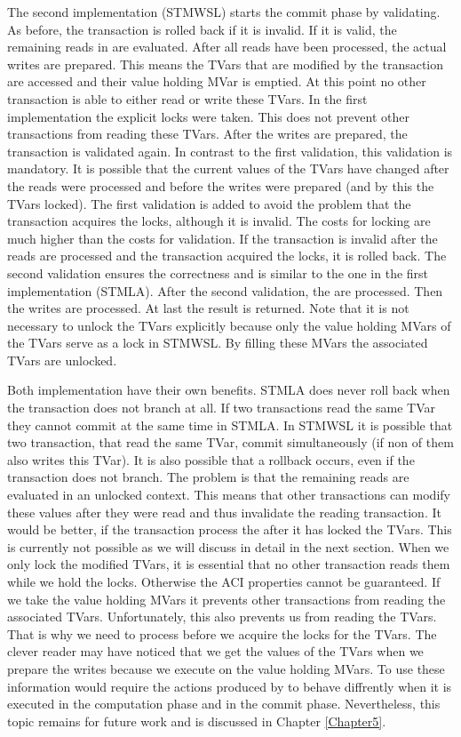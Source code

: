 The second implementation (STMWSL) starts the commit phase by validating. As before, the 
transaction is rolled back if it is invalid. If it is valid, the remaining reads in 
 are evaluated. After all reads have been processed, the actual writes are
prepared. This means the TVars that are modified by the transaction are accessed and
their value holding MVar is emptied. At this point no other transaction is able to 
either read or write these TVars. In the first implementation the explicit locks 
were taken. This does not prevent other transactions from reading these TVars.
After the writes are prepared, the transaction is validated again. In contrast to 
the first validation, this validation is mandatory. It is possible that the current
values of the TVars have changed after the reads were processed and before the 
writes were prepared (and by this the TVars locked). The first validation is
added to avoid the problem that the transaction acquires the locks, although it 
is invalid. The costs for locking are much higher than the costs for validation.
If the transaction is invalid after the reads are processed and the transaction
acquired the locks, it is rolled back. The second validation ensures the correctness
and is similar to the one in the first implementation (STMLA). After the second validation, 
the  are processed. Then the writes are processed. At last the result is returned. Note that
it is not necessary to unlock the TVars explicitly because only the value 
holding MVars of the TVars serve as a lock in STMWSL. By filling these MVars
the associated TVars are unlocked. 

Both implementation have their own benefits. STMLA does never roll back
when the transaction does not branch at all. If two transactions read the
same TVar they cannot commit at the same time in STMLA. In STMWSL it is
possible that two transaction, that read the same TVar, commit simultaneously
(if non of them also writes this TVar). It is also possible
that a rollback occurs, even if the transaction does not branch. The 
problem is that the remaining reads are evaluated in an unlocked context.
This means that other transactions can modify these values after they were 
read and thus invalidate the reading transaction. It would be better, if the
transaction process the  after it has locked the TVars. This is 
currently not possible as we will discuss in detail in the next section. When 
we only lock the modified TVars, it is essential that no other transaction 
reads them while we hold the locks. Otherwise the ACI properties cannot be 
guaranteed. If we take the value holding MVars it prevents other transactions
from reading the associated TVars. Unfortunately, this also prevents us from 
reading the TVars. That is why we need to process  before we 
acquire the locks for the TVars. The clever reader may have noticed that 
we get the values of the TVars when we prepare the writes because we execute
 on the value holding MVars. To use these information would 
require the  actions produced by  to 
behave diffrently when it is executed in the computation phase and in the 
commit phase. Nevertheless, this topic remains for future work and is discussed 
in Chapter \ref{Chapter5}.

